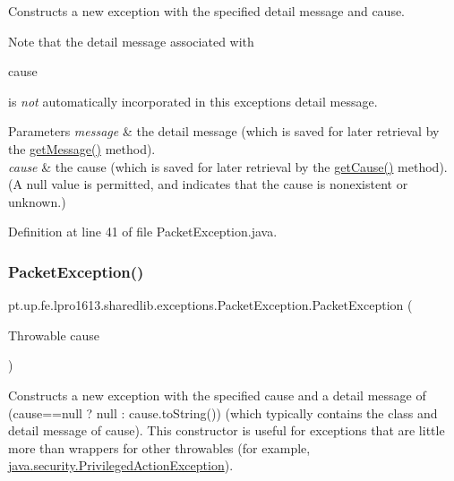 Constructs a new exception with the specified detail message and cause. 

Note that the detail message associated with
\begin{DoxyCode}
cause 
\end{DoxyCode}
 is {\itshape not} automatically incorporated in this exception\textquotesingle{}s detail message.


\begin{DoxyParams}{Parameters}
{\em message} & the detail message (which is saved for later retrieval by the \hyperlink{}{get\+Message()} method). \\
\hline
{\em cause} & the cause (which is saved for later retrieval by the \hyperlink{}{get\+Cause()} method). (A {\ttfamily null} value is permitted, and indicates that the cause is nonexistent or unknown.) \\
\hline
\end{DoxyParams}


Definition at line 41 of file Packet\+Exception.\+java.

\hypertarget{classpt_1_1up_1_1fe_1_1lpro1613_1_1sharedlib_1_1exceptions_1_1_packet_exception_ad29eb9640b76bd84e41d523a135b9d88}{}\label{classpt_1_1up_1_1fe_1_1lpro1613_1_1sharedlib_1_1exceptions_1_1_packet_exception_ad29eb9640b76bd84e41d523a135b9d88} 
\subsubsection{\texorpdfstring{Packet\+Exception()}{PacketException()}\hspace{0.1cm}{\footnotesize\ttfamily [4/4]}}
{\footnotesize\ttfamily pt.\+up.\+fe.\+lpro1613.\+sharedlib.\+exceptions.\+Packet\+Exception.\+Packet\+Exception (\begin{DoxyParamCaption}\item[{Throwable}]{cause }\end{DoxyParamCaption})}

Constructs a new exception with the specified cause and a detail message of {\ttfamily (cause==null ? null \+: cause.\+to\+String())} (which typically contains the class and detail message of {\ttfamily cause}). This constructor is useful for exceptions that are little more than wrappers for other throwables (for example, \hyperlink{}{java.\+security.\+Privileged\+Action\+Exception}).


